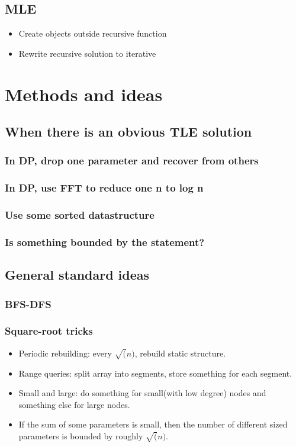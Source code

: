 \documentclass[8pt,a4paper,landscape,oneside]{amsart}
\begin{document}
\begin{multicols*}{2}
\begin{large}
\subsection{MLE}
\begin{itemize}
    \item Create objects outside recursive function
    \item Rewrite recursive solution to iterative
\end{itemize}
\section{Methods and ideas}
\subsection{When there is an obvious TLE solution}
\subsubsection{In DP, drop one parameter and recover from others}
\subsubsection{In DP, use FFT to reduce one n to log n}
\subsubsection{Use some sorted datastructure}
\subsubsection{Is something bounded by the statement?}
\subsection{General standard ideas}
\subsubsection{BFS-DFS}
\subsubsection{Square-root tricks}
\begin{itemize}
    \item Periodic rebuilding: every $\sqrt(n)$, rebuild static structure.
    \item Range queries: split array into segments, store something for each segment.
    \item Small and large: do something for small(with low degree) nodes and something else for large nodes.
    \item If the sum of some parameters is small, then the number of different sized parameters is bounded by roughly $\sqrt(n)$.
\end{itemize}

\end{large}
\end{multicols*}
\end{document}

